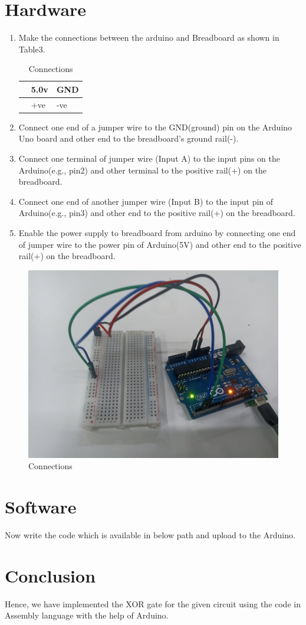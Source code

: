 \documentclass[10pt,a4paper]{article}
\begin{document}
     \section{Hardware}
	     \begin{enumerate}
		     \item Make the connections between the arduino and Breadboard as shown in Table3.
			     \begin{table}[h]
				     \centering
				     \begin{tabularx}{0.5\textwidth}
					     {
						     | >{\centering\arraybackslash}X
						     | >{\centering\arraybackslash}X
						     | >{\centering\arraybackslash}X |}
						     \hline
						     {\bf Arduino} & 5.0v & GND \\
						     \hline
						     {\bf Breadboard} & +ve & -ve  \\
						     \hline
				     \end{tabularx}
				     \caption{\label{Table-3}Connections}
			     \end{table}
			     \item Connect one end of a jumper wire to the GND(ground) pin on the Arduino Uno board and other end to the 
				     breadboard’s ground rail(-).
                             \item Connect one terminal of jumper wire (Input A) to the input pins on the Arduino(e.g., pin2) and other terminal to
				     the positive rail(+) on the breadboard.
			     \item Connect one end of another jumper wire (Input B) to the input pin of Arduino(e.g., pin3) and other end to the 
				     positive rail(+) on the breadboard.
			     \item Enable the power supply to breadboard from arduino by connecting one end of jumper wire to the power pin of
				     Arduino(5V) and other end to the positive rail(+) on the breadboard.
			     
	     \end{enumerate}
	     \begin{figure}[h!]
		     \centering
		     \includegraphics[width=0.3\columnwidth]{assembly.jpg}
		     \caption{Connections}
		     \label{fig:connections}
	     \end{figure}
     \section{Software}
	     Now write the code which is available in below path and upload to the Arduino.\\
	     \section{Conclusion}
	     Hence, we have implemented the XOR gate for the given circuit using the code in Assembly language with the help of Arduino.
\end{document}
